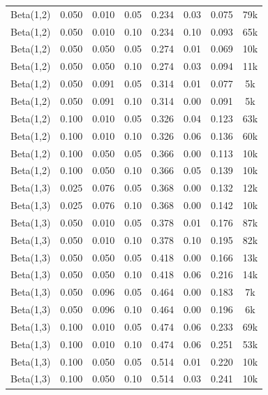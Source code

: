 \begin{table}
\begin{center}
\begin{small}
\begin{sc}
\begin{tabular}{lccc|cccc}
Beta(1,2) & 0.050 & 0.010 & 0.05 & 0.234 & 0.03 & 0.075 & 79k \\
Beta(1,2) & 0.050 & 0.010 & 0.10 & 0.234 & 0.10 & 0.093 & 65k \\
Beta(1,2) & 0.050 & 0.050 & 0.05 & 0.274 & 0.01 & 0.069 & 10k \\
Beta(1,2) & 0.050 & 0.050 & 0.10 & 0.274 & 0.03 & 0.094 & 11k \\
Beta(1,2) & 0.050 & 0.091 & 0.05 & 0.314 & 0.01 & 0.077 & 5k \\
Beta(1,2) & 0.050 & 0.091 & 0.10 & 0.314 & 0.00 & 0.091 & 5k \\
Beta(1,2) & 0.100 & 0.010 & 0.05 & 0.326 & 0.04 & 0.123 & 63k \\
Beta(1,2) & 0.100 & 0.010 & 0.10 & 0.326 & 0.06 & 0.136 & 60k \\
Beta(1,2) & 0.100 & 0.050 & 0.05 & 0.366 & 0.00 & 0.113 & 10k \\
Beta(1,2) & 0.100 & 0.050 & 0.10 & 0.366 & 0.05 & 0.139 & 10k \\
Beta(1,3) & 0.025 & 0.076 & 0.05 & 0.368 & 0.00 & 0.132 & 12k \\
Beta(1,3) & 0.025 & 0.076 & 0.10 & 0.368 & 0.00 & 0.142 & 10k \\
Beta(1,3) & 0.050 & 0.010 & 0.05 & 0.378 & 0.01 & 0.176 & 87k \\
Beta(1,3) & 0.050 & 0.010 & 0.10 & 0.378 & 0.10 & 0.195 & 82k \\
Beta(1,3) & 0.050 & 0.050 & 0.05 & 0.418 & 0.00 & 0.166 & 13k \\
Beta(1,3) & 0.050 & 0.050 & 0.10 & 0.418 & 0.06 & 0.216 & 14k \\
Beta(1,3) & 0.050 & 0.096 & 0.05 & 0.464 & 0.00 & 0.183 & 7k \\
Beta(1,3) & 0.050 & 0.096 & 0.10 & 0.464 & 0.00 & 0.196 & 6k \\
Beta(1,3) & 0.100 & 0.010 & 0.05 & 0.474 & 0.06 & 0.233 & 69k \\
Beta(1,3) & 0.100 & 0.010 & 0.10 & 0.474 & 0.06 & 0.251 & 53k \\
Beta(1,3) & 0.100 & 0.050 & 0.05 & 0.514 & 0.01 & 0.220 & 10k \\
Beta(1,3) & 0.100 & 0.050 & 0.10 & 0.514 & 0.03 & 0.241 & 10k \\
\hline
\end{tabular}
\end{sc}
\end{small}
\end{center}
\vskip -0.1in
\end{table}


